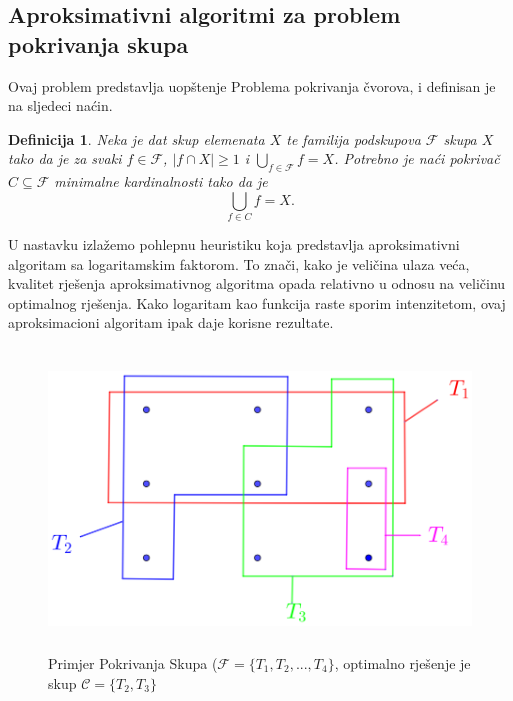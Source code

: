 \documentclass[a4paper, utf8, 11pt, colorlinks]{book}
\newtheorem{definition}{Definicija}[chapter]
\theoremstyle{definition}
\begin{document}
 \subsection{Aproksimativni algoritmi za problem pokrivanja skupa}
Ovaj problem predstavlja uopštenje Problema pokrivanja čvorova, i definisan je na sljedeci naćin.
\begin{definition}
	    Neka je dat skup elemenata $X$ te familija podskupova $\mathcal{F}$ skupa $X$ tako da je za svaki $f\in \mathcal{F}$, $|f \cap X| \geq 1$ i $\bigcup_{f \in \mathcal{F}} f = X$. 
	    Potrebno je naći pokrivač $C \subseteq \mathcal{F}$ minimalne kardinalnosti tako da je 
	    $$ \bigcup_{f \in C} f = X.$$
\end{definition}
 U nastavku izlažemo pohlepnu heuristiku koja predstavlja aproksimativni algoritam sa logaritamskim faktorom. To znači, kako je veličina ulaza veća, kvalitet rješenja aproksimativnog algoritma opada relativno u odnosu na veličinu optimalnog rješenja. Kako logaritam kao funkcija raste sporim intenzitetom, ovaj aproksimacioni algoritam ipak daje korisne rezultate.

\begin{figure}
	\centering
	\includegraphics[width=120mm, height=80mm]{set-cover-1.eps}
	\caption{Primjer Pokrivanja Skupa ($\mathcal{F}=\{T_1,T_2,...,T_4\}$, optimalno rješenje je skup $\mathcal{C}=\{T_2, T_3\}$}
	 \label{fig:set-cover-1}
\end{figure}
\end{document}
